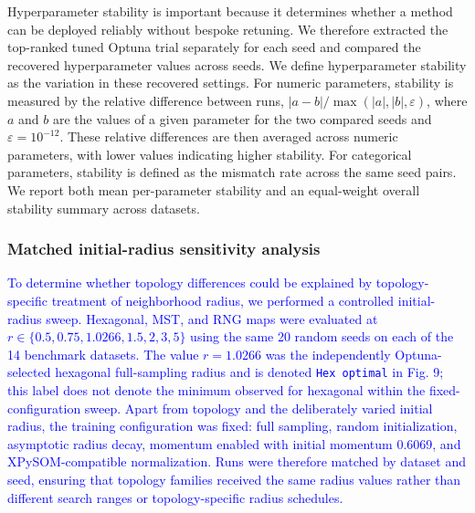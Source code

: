 \documentclass[10pt]{article} %
\newcommand{\TrackedChange}[1]{\textcolor{blue}{#1}}
\begin{document}
Hyperparameter stability is important because it determines whether a method can be deployed reliably without bespoke retuning. We therefore extracted the top-ranked tuned Optuna trial separately for each seed and compared the recovered hyperparameter values across seeds. We define hyperparameter stability as the variation in these recovered settings. For numeric parameters, stability is measured by the relative difference between runs, $|a-b| / \max(|a|,|b|,\varepsilon)$, where $a$ and $b$ are the values of a given parameter for the two compared seeds and $\varepsilon=10^{-12}$. These relative differences are then averaged across numeric parameters, with lower values indicating higher stability. For categorical parameters, stability is defined as the mismatch rate across the same seed pairs. We report both mean per-parameter stability and an equal-weight overall stability summary across datasets.

{\color{blue}\subsubsection{Matched initial-radius sensitivity analysis}}

\TrackedChange{To determine whether topology differences could be explained by topology-specific treatment of neighborhood radius, we performed a controlled initial-radius sweep.} \TrackedChange{Hexagonal, MST, and RNG maps were evaluated at $r\in\{0.5,0.75,1.0266,1.5,2,3,5\}$ using the same 20 random seeds on each of the 14 benchmark datasets.} \TrackedChange{The value $r=1.0266$ was the independently Optuna-selected hexagonal full-sampling radius and is denoted \texttt{Hex optimal} in Fig. 9; this label does not denote the minimum observed for hexagonal within the fixed-configuration sweep.} \TrackedChange{Apart from topology and the deliberately varied initial radius, the training configuration was fixed: full sampling, random initialization, asymptotic radius decay, momentum enabled with initial momentum 0.6069, and XPySOM-compatible normalization.} \TrackedChange{Runs were therefore matched by dataset and seed, ensuring that topology families received the same radius values rather than different search ranges or topology-specific radius schedules.}
\end{document}
